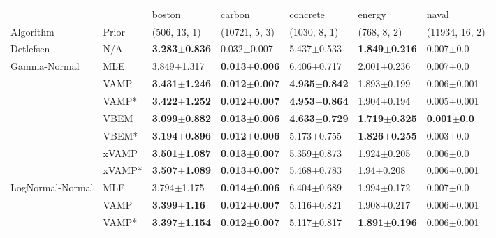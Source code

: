 \begin{tabular}{lllllll}
\toprule
                 &        &                    boston &                    carbon &                  concrete &                    energy &                   naval \\
Algorithm & Prior& (506, 13, 1)& (10721, 5, 3)& (1030, 8, 1)& (768, 8, 2)& (11934, 16, 2)\\
\midrule
Detlefsen & N/A &  \textbf{3.283$\pm$0.836} &           0.032$\pm$0.007 &           5.437$\pm$0.533 &  \textbf{1.849$\pm$0.216} &           0.007$\pm$0.0 \\
Gamma-Normal & MLE &           3.849$\pm$1.317 &  \textbf{0.013$\pm$0.006} &           6.406$\pm$0.717 &           2.001$\pm$0.236 &           0.007$\pm$0.0 \\
                 & VAMP &  \textbf{3.431$\pm$1.246} &  \textbf{0.012$\pm$0.007} &  \textbf{4.935$\pm$0.842} &           1.893$\pm$0.199 &         0.006$\pm$0.001 \\
                 & VAMP* &  \textbf{3.422$\pm$1.252} &  \textbf{0.012$\pm$0.007} &  \textbf{4.953$\pm$0.864} &           1.904$\pm$0.194 &         0.005$\pm$0.001 \\
                 & VBEM &  \textbf{3.099$\pm$0.882} &  \textbf{0.013$\pm$0.006} &  \textbf{4.633$\pm$0.729} &  \textbf{1.719$\pm$0.325} &  \textbf{0.001$\pm$0.0} \\
                 & VBEM* &  \textbf{3.194$\pm$0.896} &  \textbf{0.012$\pm$0.006} &           5.173$\pm$0.755 &  \textbf{1.826$\pm$0.255} &           0.003$\pm$0.0 \\
                 & xVAMP &  \textbf{3.501$\pm$1.087} &  \textbf{0.013$\pm$0.007} &           5.359$\pm$0.873 &           1.924$\pm$0.205 &           0.006$\pm$0.0 \\
                 & xVAMP* &  \textbf{3.507$\pm$1.089} &  \textbf{0.013$\pm$0.007} &           5.468$\pm$0.783 &            1.94$\pm$0.208 &         0.006$\pm$0.001 \\
LogNormal-Normal & MLE &           3.794$\pm$1.175 &  \textbf{0.014$\pm$0.006} &           6.404$\pm$0.689 &           1.994$\pm$0.172 &           0.007$\pm$0.0 \\
                 & VAMP &   \textbf{3.399$\pm$1.16} &  \textbf{0.012$\pm$0.007} &           5.116$\pm$0.821 &           1.908$\pm$0.217 &         0.006$\pm$0.001 \\
                 & VAMP* &  \textbf{3.397$\pm$1.154} &  \textbf{0.012$\pm$0.007} &           5.117$\pm$0.817 &  \textbf{1.891$\pm$0.196} &         0.006$\pm$0.001 \\

\end{tabular}
